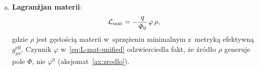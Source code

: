 \begin{hypothesis}
\begin{enumerate}[(a)]
  \item \textbf{Lagran\.zjan materii}:
  \begin{equation}\label{eq:L-mat-unified}
    \mathcal{L}_{\mathrm{mat}}
    = -\frac{q}{\varPhi_0}\,\varphi\,\rho,
  \end{equation}
  gdzie $\rho$ jest g\k{e}sto\'sci\k{a} materii w~sprz\k{e}\.zeniu
  minimalnym z~metryk\k{a} efektywn\k{a} $g_{\mu\nu}^{\mathrm{eff}}$.
  Czynnik $\varphi$ w~\eqref{eq:L-mat-unified} odzwierciedla fakt,
  \.ze \'zr\'od\l{}o $\rho$ generuje pole $\Phi$, nie $\varphi^0$
  (aksjomat~\ref{ax:zrodlo}).

\end{enumerate}
\end{hypothesis}
